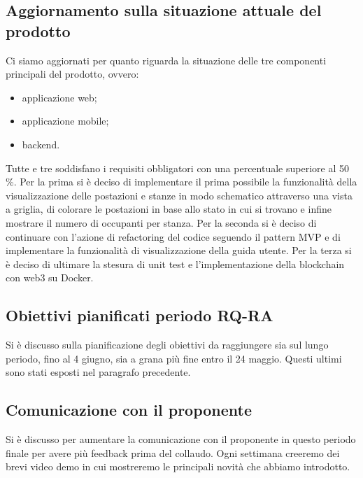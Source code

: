 \subsection*{Aggiornamento sulla situazione attuale del prodotto}
Ci siamo aggiornati per quanto riguarda la situazione delle tre componenti principali del prodotto, ovvero:
\begin{itemize}
	\item applicazione web;
	\item applicazione mobile;
	\item backend.
\end{itemize}
Tutte e tre soddisfano i requisiti obbligatori con una percentuale superiore al 50 \%.
Per la prima si è deciso di implementare il prima possibile la funzionalità della visualizzazione delle postazioni e stanze in modo schematico attraverso una vista a griglia, di colorare le postazioni in base allo stato in cui si trovano e infine mostrare il numero di occupanti per stanza.
Per la seconda si è deciso di continuare con l'azione di refactoring del codice seguendo il pattern MVP e di implementare la funzionalità di visualizzazione della guida utente.
Per la terza si è deciso di ultimare la stesura di unit test e l'implementazione della blockchain con web3 su Docker.
\subsection*{Obiettivi pianificati periodo RQ-RA}
Si è discusso sulla pianificazione degli obiettivi da raggiungere sia sul lungo periodo, fino al 4 giugno, sia a grana più fine entro il 24 maggio. Questi ultimi sono stati esposti nel paragrafo precedente.
\subsection*{Comunicazione con il proponente}
Si è discusso per aumentare la comunicazione con il proponente in questo periodo finale per avere più feedback prima del collaudo. Ogni settimana creeremo dei brevi video demo in cui mostreremo le principali novità che abbiamo introdotto.

